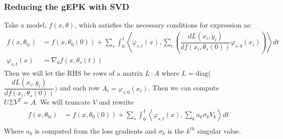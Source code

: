 \begin{frame}
  \frametitle{Reducing the gEPK with SVD}

Take a model, $f(x, \theta)$, which satisfies the necessary conditions for expression as:
 \begin{align}
     f(x, \theta_\text{tr}) &= f(x, \theta_0(0)) +  \sum_s
\int_0^1                                  \left\langle 
                                   \varphi_{s,t}(x) , \sum_i
                                   \left(\dfrac{dL(x_i, y_i)}{df(x_i,
                                   \theta_s(0))} \varphi_{s,
                                   0}(x_i)\right) \right \rangle dt\\
     \varphi_{s,t}(x) &= \nabla_\theta f(x, \theta_s(t))
 \end{align}
Then we will let the RHS be rows of a matrix $L \cdot A$ where $L =
$diag($\dfrac{dL(x_i, y_i)}{df(x_i, \theta_s(0))})$ and each row $A_i
= \varphi_{s,0}(x_i)$. Then we can compute $U\Sigma V^T =
A$. We will truncate $V$ and rewrite
\begin{align}
     f(x, \theta_\text{tr}) &= f(x, \theta_0(0)) +  \sum_s
\int_0^1                                  \left\langle 
                                   \varphi_{s,t}(x) , \sum_k
                                   a_k\sigma_k V_k \right \rangle dt\\
\end{align}
Where $a_k$ is computed from the loss gradients and $\sigma_k$ is the
$k^{\text{th}}$ singular value.

\end{frame}

